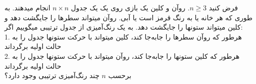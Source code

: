 فرض کنید $n \ge 3$. روآن و کلین یک بازی روی یک یک جدول $n \times n$ انجام میدهند.
به طوری که هر خانه یا به رنگ قرمز است یا آبی.
روآن میتواند سطرها را جایگشت دهد و کلین میتواند ستونها را جایگشت دهد.
به یک رنگ‌آمیزی از جدول ترتیبی میگوییم اگر:\\
1. هرطور که روآن سطرها را جابه‌جا کند، کلین میتواند با حرکت ستونها جدول را به حالت اولیه برگرداند
\\
2. هرطور که کلین ستونها را جابه‌جا کند، روآن میتواند با حرکت ستونها جدول را به حالت اولیه برگرداند\\
برحسب $n$ چند رنگ‌آمیزی ترتیبی وجود دارد؟
